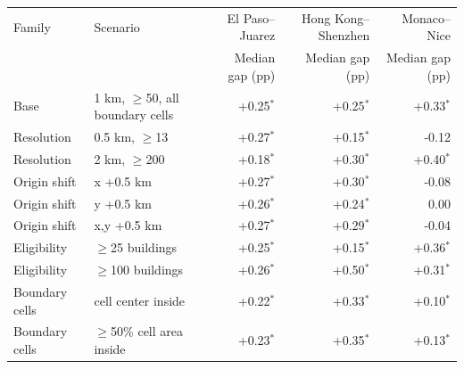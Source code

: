 \begin{tabular}{@{}llrrr@{}}
\toprule
Family & Scenario & El Paso--Juarez & Hong Kong--Shenzhen & Monaco--Nice \\
 & & Median gap (pp) & Median gap (pp) & Median gap (pp) \\
\midrule
Base & 1 km, $\geq$50, all boundary cells & +0.25$^{*}$ & +0.25$^{*}$ & +0.33$^{*}$ \\
Resolution & 0.5 km, $\geq$13 & +0.27$^{*}$ & +0.15$^{*}$ & -0.12 \\
Resolution & 2 km, $\geq$200 & +0.18$^{*}$ & +0.30$^{*}$ & +0.40$^{*}$ \\
Origin shift & x +0.5 km & +0.27$^{*}$ & +0.30$^{*}$ & -0.08 \\
Origin shift & y +0.5 km & +0.26$^{*}$ & +0.24$^{*}$ & 0.00 \\
Origin shift & x,y +0.5 km & +0.27$^{*}$ & +0.29$^{*}$ & -0.04 \\
Eligibility & $\geq$25 buildings & +0.25$^{*}$ & +0.15$^{*}$ & +0.36$^{*}$ \\
Eligibility & $\geq$100 buildings & +0.26$^{*}$ & +0.50$^{*}$ & +0.31$^{*}$ \\
Boundary cells & cell center inside & +0.22$^{*}$ & +0.33$^{*}$ & +0.10$^{*}$ \\
Boundary cells & $\geq$50\% cell area inside & +0.23$^{*}$ & +0.35$^{*}$ & +0.13$^{*}$ \\
\bottomrule
\end{tabular}
